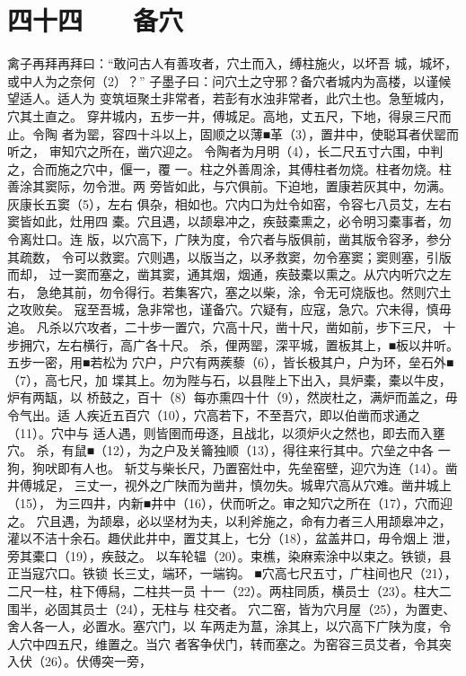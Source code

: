 \documentclass[12pt,UTF8]{ctexbook}
\begin{document}
\chapter{四十四　　备穴}

禽子再拜再拜曰：“敢问古人有善攻者，穴土而入，缚柱施火，以坏吾 
城，城坏，或中人为之奈何（2）？” 
子墨子曰：问穴土之守邪？备穴者城内为高楼，以谨候望适人。适人为 
变筑垣聚土非常者，若彭有水浊非常者，此穴土也。急堑城内，穴其土直之。 
穿井城内，五步一井，傅城足。高地，丈五尺，下地，得泉三尺而止。令陶 
者为罂，容四十斗以上，固顺之以薄■革（3），置井中，使聪耳者伏罂而听之， 
审知穴之所在，凿穴迎之。 
令陶者为月明（4），长二尺五寸六围，中判之，合而施之穴中，偃一，覆 
一。柱之外善周涂，其傅柱者勿烧。柱者勿烧。柱善涂其窦际，勿令泄。两 
旁皆如此，与穴俱前。下迫地，置康若灰其中，勿满。灰康长五窦（5），左右 
俱杂，相如也。穴内口为灶令如窑，令容七八员艾，左右窦皆如此，灶用四 
橐。穴且遇，以颉皋冲之，疾鼓橐熏之，必令明习橐事者，勿令离灶口。连 
版，以穴高下，广陕为度，令穴者与版俱前，凿其版令容矛，参分其疏数， 
令可以救窦。穴则遇，以版当之，以矛救窦，勿令塞窦；窦则塞，引版而却， 
过一窦而塞之，凿其窦，通其烟，烟通，疾鼓橐以熏之。从穴内听穴之左右， 
急绝其前，勿令得行。若集客穴，塞之以柴，涂，令无可烧版也。然则穴土 
之攻败矣。 
寇至吾城，急非常也，谨备穴。穴疑有，应寇，急穴。穴未得，慎毋追。 
凡杀以穴攻者，二十步一置穴，穴高十尺，凿十尺，凿如前，步下三尺， 
十步拥穴，左右横行，高广各十尺。 
杀，俚两罂，深平城，置板其上，■板以井听。五步一密，用■若松为 
穴户，户穴有两蒺藜（6），皆长极其户，户为环，垒石外■（7），高七尺，加 
堞其上。勿为陛与石，以县陛上下出入，具炉橐，橐以牛皮，炉有两缻，以 
桥鼓之，百十（8）每亦熏四十什（9），然炭杜之，满炉而盖之，毋令气出。适 
人疾近五百穴（10），穴高若下，不至吾穴，即以伯凿而求通之（11）。穴中与 
适人遇，则皆圉而毋逐，且战北，以须炉火之然也，即去而入壅穴。 
杀，有鼠■（12），为之户及关籥独顺（13），得往来行其中。穴垒之中各 
一狗，狗吠即有人也。 
斩艾与柴长尺，乃置窑灶中，先垒窑壁，迎穴为连（14）。凿井傅城足， 
三丈一，视外之广陕而为凿井，慎勿失。城卑穴高从穴难。凿井城上（15）， 
为三四井，内新■井中（16），伏而听之。审之知穴之所在（17），穴而迎之。 
穴且遇，为颉皋，必以坚材为夫，以利斧施之，命有力者三人用颉皋冲之， 
灌以不洁十余石。趣伏此井中，置艾其上，七分（18），盆盖井口，毋令烟上 
泄，旁其橐口（19），疾鼓之。 
以车轮辒（20）。束樵，染麻索涂中以束之。铁锁，县正当寇穴口。铁锁 
长三丈，端环，一端钩。 
■穴高七尺五寸，广柱间也尺（21），二尺一柱，柱下傅舄，二柱共一员 
十一（22）。两柱同质，横员士（23）。柱大二围半，必固其员士（24），无柱与 
柱交者。 
穴二窑，皆为穴月屋（25），为置吏、舍人各一人，必置水。塞穴门，以 
车两走为蒀，涂其上，以穴高下广陕为度，令人穴中四五尺，维置之。当穴 
者客争伏门，转而塞之。为窑容三员艾者，令其突入伏（26）。伏傅突一旁， 
\end{document}
